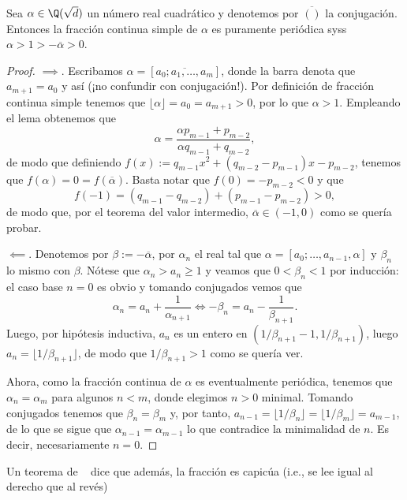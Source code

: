 \documentclass[teoria-numeros.tex]{subfiles}
\begin{document}
\begin{prop}
	Sea $\alpha \in \Q(\sqrt{d})$ un número real cuadrático y denotemos por $\overline{()}$ la conjugación.
	Entonces la fracción continua simple de $\alpha$ es puramente periódica syss $\alpha > 1 > -\overline{\alpha} > 0$.
\end{prop}
\begin{proof}
	$\implies$. Escribamos $\alpha = [ \overline{a_0; a_1, \dots, a_m} ]$, donde la barra denota que $a_{m+1} = a_0$ y así (¡no confundir con conjugación!).
	Por definición de fracción continua simple tenemos que $\lfloor \alpha \rfloor = a_0 = a_{m+1} > 0$, por lo que $\alpha > 1$.
	Empleando el lema obtenemos que
	$$ \alpha = \frac{\alpha p_{m-1} + p_{m-2}}{\alpha q_{m-1} + q_{m-2}}, $$
	de modo que definiendo $f(x) := q_{m-1}x^2 + (q_{m-2} - p_{m-1})x - p_{m-2}$, tenemos que $f(\alpha) = 0 = f(\overline{\alpha})$.
	Basta notar que $f(0) = -p_{m-2} < 0$ y que
	$$ f(-1) = (q_{m-1} - q_{m-2}) + (p_{m-1} - p_{m-2}) > 0, $$
	de modo que, por el teorema del valor intermedio, $\overline{\alpha} \in (-1, 0)$ como se quería probar.

	$\impliedby$. Denotemos por $\beta := -\overline{\alpha}$, por $\alpha_n$ el real tal que $\alpha = [a_0; \dots, a_{n-1}, \alpha]$
	y $\beta_n$ lo mismo con $\beta$.
	Nótese que $\alpha_n > a_n \ge 1$ y veamos que $0 < \beta_n < 1$ por inducción:
	el caso base $n = 0$ es obvio y tomando conjugados vemos que
	$$ \alpha_n = a_n + \frac{1}{\alpha_{n+1}} \iff -\beta_n = a_n - \frac{1}{\beta_{n+1}}. $$
	Luego, por hipótesis inductiva, $a_n$ es un entero en $( 1/\beta_{n+1} - 1, 1/\beta_{n+1} )$, luego $a_n = \lfloor 1/\beta_{n+1} \rfloor$,
	de modo que $1/\beta_{n+1} > 1$ como se quería ver.

	Ahora, como la fracción continua de $\alpha$ es eventualmente periódica, tenemos que $\alpha_n = \alpha_m$ para algunos $n < m$,
	donde elegimos $n > 0$ minimal.
	Tomando conjugados tenemos que $\beta_n = \beta_m$ y, por tanto, $a_{n-1} = \lfloor 1/\beta_n \rfloor = \lfloor 1/\beta_m \rfloor = a_{m-1}$,
	de lo que se sigue que $\alpha_{n-1} = \alpha_{m-1}$ lo que contradice la minimalidad de $n$.
	Es decir, necesariamente $n = 0$.
\end{proof}

Un teorema de \citeauthor{lehmer00continued}~\cite{lehmer00continued} dice que además, la fracción es capicúa (i.e., se lee igual al derecho que al revés)
\end{document}
